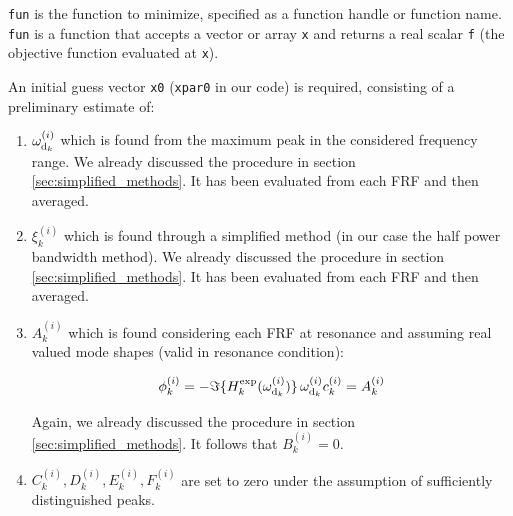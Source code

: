 \documentclass[a4paper,12pt,oneside]{article}
\begin{document}
\lstinline!fun! is the function to minimize, specified as a function handle or function name. \lstinline!fun! is a function that accepts a vector or array \lstinline!x! and returns a real scalar \lstinline!f! (the objective function evaluated at \lstinline!x!).

An initial guess vector \lstinline!x0! (\lstinline!xpar0! in our code) is required, consisting of a preliminary estimate of:

\begin{enumerate}
	\item $ \omega_{\textup{d}_k}^{(i)} $ which is found from the maximum peak in the considered frequency range. We already discussed the procedure in section \ref{sec:simplified_methods}. It has been evaluated from each FRF and then averaged.
	\item $ \xi_k^{(i)} $ which is found through a simplified method (in our case the half power bandwidth method). We already discussed the procedure in section \ref{sec:simplified_methods}. It has been evaluated from each FRF and then averaged.
	\item $ A_k^{(i)} $ which is found considering each FRF at resonance and assuming real valued mode shapes (valid in resonance condition):

\[
	\phi^{(i)}_k =
		- \Im\{H^{\textup{exp}}_k(\omega_{\textup{d}_k}^{(i)})\} \,
		\omega_{\textup{d}_k}^{(i)} c^{(i)}_k	= A^{(i)}_k
\]

Again, we already discussed the procedure in section \ref{sec:simplified_methods}.
It follows that $ B^{(i)}_k = 0 $.
	\item $C^{(i)}_k , D^{(i)}_k, E^{(i)}_k, 	F^{(i)}_k $ are set to zero under the assumption of sufficiently distinguished peaks.
\end{enumerate}
\end{document}
